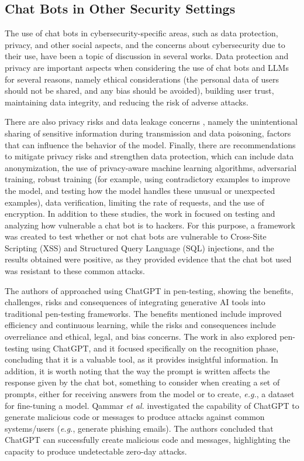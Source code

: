 \documentclass[sigconf]{acmart}
\begin{document}
\subsection{Chat Bots in Other Security Settings}
The use of chat bots in cybersecurity-specific areas, such as data protection, privacy, and other social aspects, and the concerns about cybersecurity due to their use, have been a topic of discussion in several works. Data protection and privacy are important aspects when considering the use of chat bots and LLMs \cite{Sebastian23} for several reasons, namely ethical considerations (the personal data of users should not be shared, and any bias should be avoided), building user trust, maintaining data integrity, and reducing the risk of adverse attacks. 

There are also privacy risks and data leakage concerns \cite{Hasal21}, namely the unintentional sharing of sensitive information during transmission and data poisoning, factors that can influence the behavior of the model. Finally, there are recommendations to mitigate privacy risks and strengthen data protection, which can include data anonymization, the use of privacy-aware machine learning algorithms, adversarial training, robust training (for example, using contradictory examples to improve the model, and testing how the model handles these unusual or unexpected examples), data verification, limiting the rate of requests, and the use of encryption. In addition to these studies, the work in \cite{Bozic18} focused on testing and analyzing how vulnerable a chat bot is to hackers. For this purpose, a framework was created to test whether or not chat bots are vulnerable to Cross-Site Scripting (XSS) and Structured Query Language (SQL) injections, and the results obtained were positive, as they provided evidence that the chat bot used was resistant to these common attacks. 

The authors of \cite{Hilario24} approached using ChatGPT in pen-testing, showing the benefits, challenges, risks and consequences of integrating generative AI tools into traditional pen-testing frameworks. The benefits mentioned include improved efficiency and continuous learning, while the risks and consequences include overreliance and ethical, legal, and bias concerns. The work in \cite{Temara23} also explored pen-testing using ChatGPT, and it focused specifically on the recognition phase, concluding that it is a valuable tool, as it provides insightful information. In addition, it is worth noting that the way the prompt is written affects the response given by the chat bot, something to consider when creating a set of prompts, either for receiving answers from the model or to create, \textit{e.g.}, a dataset for fine-tuning a model. Qammar \textit{et al.} \cite{Qammar23} investigated the capability of ChatGPT to generate malicious code or messages to produce attacks against common systems/users (\textit{e.g.}, generate phishing emails). The authors concluded that ChatGPT can successfully create malicious code and messages, highlighting the capacity to produce undetectable zero-day attacks.
\end{document}
